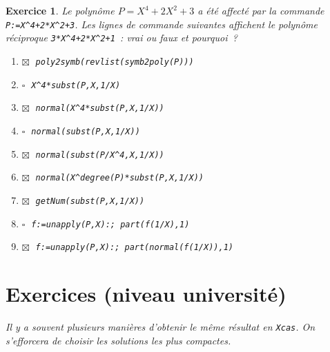 \documentclass{article}
\newcommand{\faux}{$\square\;$}
\newcommand{\vrai}{$\boxtimes\;$}
\newcommand{\itemf}{\item\faux}
\newcommand{\itemvv}{\item\vrai}
\newtheorem{exo}{Exercice}[section]
\begin{document}
\begin{giacjshere}
\begin{exo}{\rm
Le polyn\^ome $P=X^4+2X^2+3$ a \'et\'e affect\'e 
par la commande \verb|P:=X^4+2*X^2+3|.
Les lignes de commande suivantes affichent
le polyn\^ome r\'eciproque \verb|3*X^4+2*X^2+1|~: 
vrai ou faux et pourquoi~? 
\begin{enumerate}
\itemvv
\verb|poly2symb(revlist(symb2poly(P)))|
\itemf
\verb|X^4*subst(P,X,1/X)|
\itemvv
\verb|normal(X^4*subst(P,X,1/X))|
\itemf
\verb|normal(subst(P,X,1/X))|
\itemvv
\verb|normal(subst(P/X^4,X,1/X))|
\itemvv
\verb|normal(X^degree(P)*subst(P,X,1/X))|
\itemvv
\verb|getNum(subst(P,X,1/X))|
\itemf
\verb|f:=unapply(P,X):; part(f(1/X),1)|
\itemvv
\verb|f:=unapply(P,X):; part(normal(f(1/X)),1)|
\end{enumerate}
}\end{exo}

\section{Exercices (niveau universit\'e)}

{\it
Il y a souvent plusieurs mani\`eres d'obtenir le m\^eme r\'esultat en
{\tt Xcas}. On s'efforcera de choisir les solutions les plus compactes.
}


\end{giacjshere}
\end{document}
